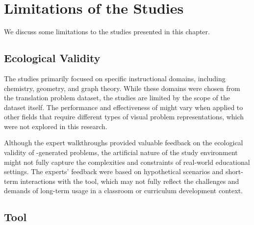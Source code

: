\section{Limitations of the Studies}

We discuss some limitations to the studies presented in this chapter. 




\subsection{Ecological Validity}

The studies primarily focused on specific instructional domains, including chemistry, geometry, and graph theory. While these domains were chosen from the translation problem dataset, the studies are limited by the scope of the dataset itself. The performance and effectiveness of \Edgeworth might vary when applied to other fields that require different types of visual problem representations, which were not explored in this research.

Although the expert walkthroughs provided valuable feedback on the ecological validity of \Edgeworth-generated problems, the artificial nature of the study environment might not fully capture the complexities and constraints of real-world educational settings. The experts' feedback were based on hypothetical scenarios and short-term interactions with the tool, which may not fully reflect the challenges and demands of long-term usage in a classroom or curriculum development context.

\subsection{Tool}
\label{sec:edgeworth-limitations}

